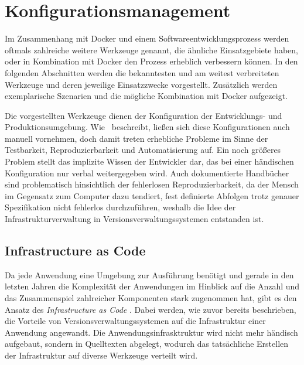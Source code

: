 \chapter{Konfigurationsmanagement}
\label{cha:konfigurationsmanagement}
Im Zusammenhang mit Docker und einem Softwareentwicklungsprozess werden oftmals zahlreiche weitere Werkzeuge genannt, die ähnliche Einsatzgebiete haben, oder in Kombination mit Docker den Prozess erheblich verbessern können.
In den folgenden Abschnitten werden die bekanntesten und am weitest verbreiteten Werkzeuge und deren jeweilige Einsatzzwecke vorgestellt.
Zusätzlich werden exemplarische Szenarien und die mögliche Kombination mit Docker aufgezeigt.

Die vorgestellten Werkzeuge dienen der Konfiguration der Entwicklungs- und Produktionsumgebung.
Wie~\autocite[29\psq]{Wolff201604} beschreibt, ließen sich diese Konfigurationen auch manuell vornehmen, doch damit treten erhebliche Probleme im Sinne der Testbarkeit, Reproduzierbarkeit und Automatisierung auf.
Ein noch größeres Problem stellt das implizite Wissen der Entwickler dar, das bei einer händischen Konfiguration nur verbal weitergegeben wird.
Auch dokumentierte Handbücher sind problematisch hinsichtlich der fehlerlosen Reproduzierbarkeit, da der Mensch im Gegensatz zum Computer dazu tendiert, fest definierte Abfolgen trotz genauer Spezifikation nicht fehlerlos durchzuführen, weshalb die Idee der Infrastrukturverwaltung in Versionsverwaltungssystemen entstanden ist.


\section{Infrastructure as Code}
\label{sec:infrastructureascode}
Da jede Anwendung eine Umgebung zur Ausführung benötigt und gerade in den letzten Jahren die Komplexität der Anwendungen im Hinblick auf die Anzahl und das Zusammenspiel zahlreicher Komponenten stark zugenommen hat, gibt es den Ansatz des \emph{Infrastructure as Code} \autocite{InfrastructureAsCode:online}.
Dabei werden, wie zuvor bereits beschrieben, die Vorteile von Versionsverwaltungssystemen auf die Infrastruktur einer Anwendung angewandt.
Die Anwendungsinfrasktruktur wird nicht mehr händisch aufgebaut, sondern in Quelltexten abgelegt, wodurch das tatsächliche Erstellen der Infrastruktur auf diverse Werkzeuge verteilt wird.

